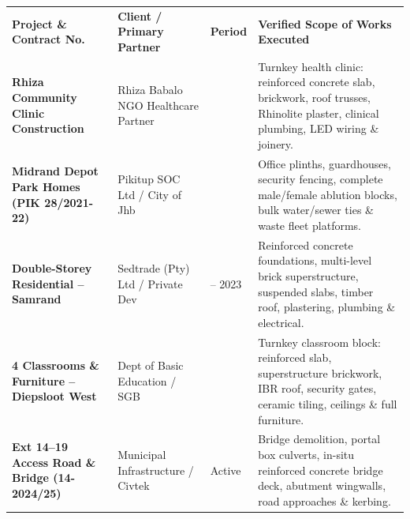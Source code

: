 \documentclass[a4paper,11pt]{article}
\begin{document}
\renewcommand{\arraystretch}{1.30}
\begin{tabularx}{\textwidth}{@{}p{3.8cm} p{3.2cm} p{1.8cm} X@{}}
\rowcolor{mhnavy}
{\color{white}\bfseries\fontsize{8pt}{9.8pt}\selectfont Project \& Contract No.} &
{\color{white}\bfseries\fontsize{8pt}{9.8pt}\selectfont Client / Primary Partner} &
{\color{white}\bfseries\fontsize{8pt}{9.8pt}\selectfont Period} &
{\color{white}\bfseries\fontsize{8pt}{9.8pt}\selectfont Verified Scope of Works Executed} \\
\rowcolor{mhbluelight}
\fontsize{7.6pt}{9.4pt}\selectfont\bfseries Rhiza Community Clinic Construction & \fontsize{7.6pt}{9.4pt}\selectfont Rhiza Babalo NGO Healthcare Partner & \fontsize{7.6pt}{9.4pt}\selectfont 2021 & \fontsize{7.6pt}{9.4pt}\selectfont Turnkey health clinic: reinforced concrete slab, brickwork, roof trusses, Rhinolite plaster, clinical plumbing, LED wiring \& joinery. \\
\fontsize{7.6pt}{9.4pt}\selectfont\bfseries Midrand Depot Park Homes (PIK 28/2021-22) & \fontsize{7.6pt}{9.4pt}\selectfont Pikitup SOC Ltd / City of Jhb & \fontsize{7.6pt}{9.4pt}\selectfont 2022 & \fontsize{7.6pt}{9.4pt}\selectfont Office plinths, guardhouses, security fencing, complete male/female ablution blocks, bulk water/sewer ties \& waste fleet platforms. \\
\rowcolor{mhbluelight}
\fontsize{7.6pt}{9.4pt}\selectfont\bfseries Double-Storey Residential -- Samrand & \fontsize{7.6pt}{9.4pt}\selectfont Sedtrade (Pty) Ltd / Private Dev & \fontsize{7.6pt}{9.4pt}\selectfont 2022 -- 2023 & \fontsize{7.6pt}{9.4pt}\selectfont Reinforced concrete foundations, multi-level brick superstructure, suspended slabs, timber roof, plastering, plumbing \& electrical. \\
\fontsize{7.6pt}{9.4pt}\selectfont\bfseries 4 Classrooms \& Furniture -- Diepsloot West & \fontsize{7.6pt}{9.4pt}\selectfont Dept of Basic Education / SGB & \fontsize{7.6pt}{9.4pt}\selectfont 2023 & \fontsize{7.6pt}{9.4pt}\selectfont Turnkey classroom block: reinforced slab, superstructure brickwork, IBR roof, security gates, ceramic tiling, ceilings \& full furniture. \\
\rowcolor{mhbluelight}
\fontsize{7.6pt}{9.4pt}\selectfont\bfseries Ext 14--19 Access Road \& Bridge (14-2024/25) & \fontsize{7.6pt}{9.4pt}\selectfont Municipal Infrastructure / Civtek & \fontsize{7.6pt}{9.4pt}\selectfont Active & \fontsize{7.6pt}{9.4pt}\selectfont Bridge demolition, portal box culverts, in-situ reinforced concrete bridge deck, abutment wingwalls, road approaches \& kerbing. \\
\end{tabularx}
\renewcommand{\arraystretch}{1}
\end{document}
